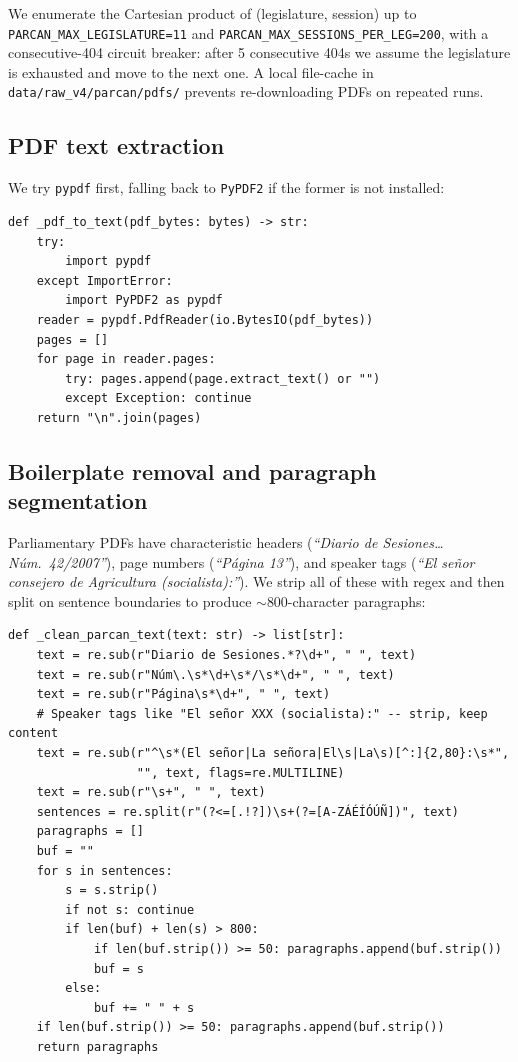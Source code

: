 \documentclass[11pt,a4paper]{article}
\begin{document}
We enumerate the Cartesian product of (legislature, session) up to
\texttt{PARCAN\_MAX\_LEGISLATURE=11} and
\texttt{PARCAN\_MAX\_SESSIONS\_PER\_LEG=200}, with a consecutive-404
circuit breaker: after 5 consecutive 404s we assume the legislature is
exhausted and move to the next one. A local file-cache in
\texttt{data/raw\_v4/parcan/pdfs/} prevents re-downloading PDFs on
repeated runs.

\subsection{PDF text extraction}

We try \texttt{pypdf} first, falling back to \texttt{PyPDF2} if the
former is not installed:

\begin{lstlisting}[style=pycode,caption={PDF extraction.}]
def _pdf_to_text(pdf_bytes: bytes) -> str:
    try:
        import pypdf
    except ImportError:
        import PyPDF2 as pypdf
    reader = pypdf.PdfReader(io.BytesIO(pdf_bytes))
    pages = []
    for page in reader.pages:
        try: pages.append(page.extract_text() or "")
        except Exception: continue
    return "\n".join(pages)
\end{lstlisting}

\subsection{Boilerplate removal and paragraph segmentation}

Parliamentary PDFs have characteristic headers (\emph{``Diario de
Sesiones\ldots Núm.\ 42/2007''}), page numbers (\emph{``Página 13''}),
and speaker tags (\emph{``El señor consejero de Agricultura
(socialista):''}). We strip all of these with regex and then split on
sentence boundaries to produce $\sim$800-character paragraphs:

\begin{lstlisting}[style=pycode,caption={Parlamento de Canarias text cleaner.}]
def _clean_parcan_text(text: str) -> list[str]:
    text = re.sub(r"Diario de Sesiones.*?\d+", " ", text)
    text = re.sub(r"Núm\.\s*\d+\s*/\s*\d+", " ", text)
    text = re.sub(r"Página\s*\d+", " ", text)
    # Speaker tags like "El señor XXX (socialista):" -- strip, keep content
    text = re.sub(r"^\s*(El señor|La señora|El\s|La\s)[^:]{2,80}:\s*",
                  "", text, flags=re.MULTILINE)
    text = re.sub(r"\s+", " ", text)
    sentences = re.split(r"(?<=[.!?])\s+(?=[A-ZÁÉÍÓÚÑ])", text)
    paragraphs = []
    buf = ""
    for s in sentences:
        s = s.strip()
        if not s: continue
        if len(buf) + len(s) > 800:
            if len(buf.strip()) >= 50: paragraphs.append(buf.strip())
            buf = s
        else:
            buf += " " + s
    if len(buf.strip()) >= 50: paragraphs.append(buf.strip())
    return paragraphs
\end{lstlisting}
\end{document}
